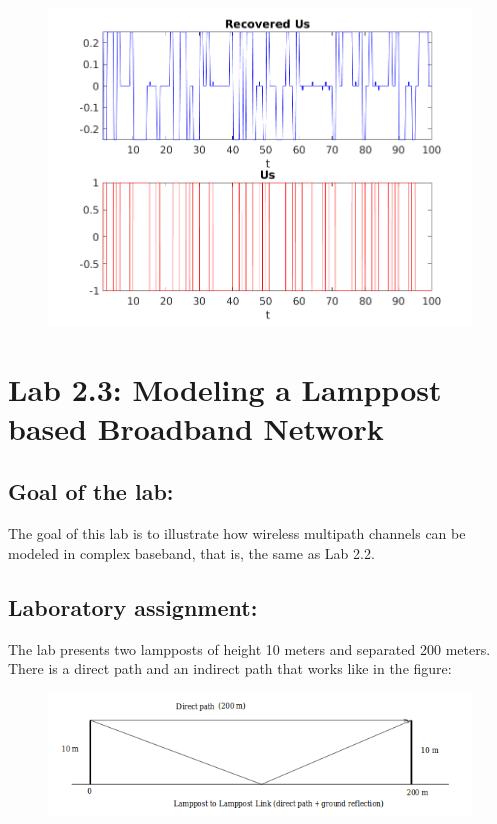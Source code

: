 \documentclass[a4paper,11pt]{article}
\begin{document}
\begin{figure}[!ht]
	\centering
	\includegraphics[scale = 0.8]{images/1_6b.png}
\end{figure}

\newpage

\section{Lab 2.3: Modeling a Lamppost based Broadband Network}

\subsection{Goal of the lab:}

The goal of this lab is to illustrate how wireless multipath channels can be
modeled in complex baseband, that is, the same as Lab 2.2.

\subsection{Laboratory assignment:}

The lab presents two lampposts of height 10 meters and separated 200 meters.
There is a direct path and an indirect path that works like in the figure:

\begin{figure}[!ht]
	\centering
	\includegraphics[scale = 0.8]{images/figure1.png}
\end{figure}
\end{document}
